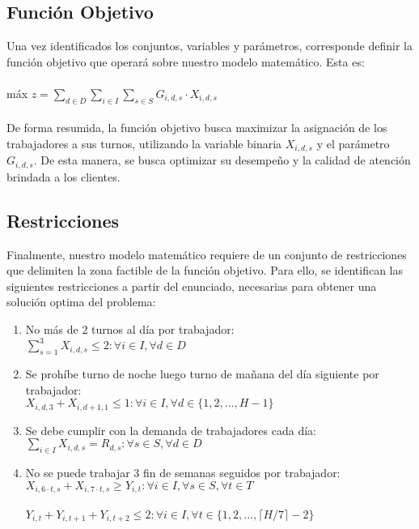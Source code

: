\subsection{Función Objetivo}
Una vez identificados los conjuntos, variables y parámetros, corresponde definir la función objetivo que operará sobre nuestro modelo matemático. Esta es:\\\\
máx $z=\displaystyle\sum_{d\in D} \sum_{i\in I} \sum_{s\in S}G_{i,d,s} \cdot X_{i,d,s}$\\\\
De forma resumida, la función objetivo busca maximizar la asignación de los trabajadores a sus turnos, utilizando la variable binaria $X_{i,d,s}$ y el parámetro $G_{i,d,s}$. De esta manera, se busca optimizar su desempeño y la calidad de atención brindada a los clientes.
\subsection{Restricciones}
Finalmente, nuestro modelo matemático requiere de un conjunto de restricciones que delimiten la zona factible de la función objetivo. Para ello, se identifican las siguientes restricciones a partir del enunciado, necesarias para obtener una solución optima del problema:
\begin{enumerate}
    \item No más de 2 turnos al día por trabajador:\\
    $\displaystyle\sum_{s=1}^{3}X_{i,d,s}\leq 2:\forall i\in I, \forall d\in D$
    \item Se prohíbe turno de noche luego turno de mañana del día siguiente por trabajador:\\
    $X_{i,d,3}+X_{i,d+1,1}\leq 1:\forall i\in I, \forall d\in \{1,2,..., H-1\}$
    \item Se debe cumplir con la demanda de trabajadores cada día:\\
    $\displaystyle\sum_{i\in I}X_{i,d,s}= R_{d,s}:\forall s\in S, \forall d\in D$
    \item No se puede trabajar 3 fin de semanas seguidos por trabajador:\\
    $X_{i,6\cdot t,s}+X_{i,7\cdot t,s}\ge Y_{i,t}: \forall i \in I, \forall s \in S, \forall t \in T$\\\\
    $Y_{i,t}+Y_{i,t+1}+Y_{i,t+2}\leq 2:\forall i\in I, \forall t\in \{1,2,...,\lceil H/7 \rceil-2\}$
\end{enumerate}


